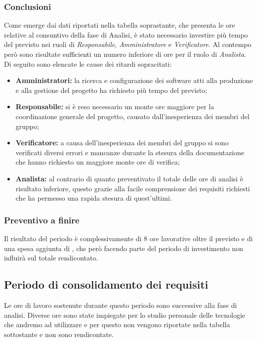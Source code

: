 \subsubsection{Conclusioni}
Come emerge dai dati riportati nella tabella soprastante, che presenta le ore relative al consuntivo della fase di Analisi, è stato necessario investire più tempo del previsto nei ruoli di \textit{Responsabile}, \textit{Amministratore} e \textit{Verificatore}.  Al contempo però sono risultate sufficienti
un numero inferiore di ore per il ruolo di \textit{Analista}. 
Di seguito sono elencate le cause dei ritardi sopracitati:
\begin{itemize}
	\item \textbf{Amministratori:} la ricerca e configurazione dei software atti alla produzione e alla gestione del progetto ha richiesto più tempo del previsto;
	\item \textbf{Responsabile:} si è reso necessario un monte ore maggiore per la coordinazione generale del progetto, causato dall'inesperienza dei membri del gruppo; 
	\item \textbf{Verificatore:} a causa dell'inesperienza dei membri del gruppo si sono verificati diversi errori e mancanze durante la stesura della documentazione che hanno richiesto un maggiore monte ore di verifica;
	\item \textbf{Analista:} al contrario di quanto preventivato il totale delle ore di analisi è risultato inferiore, questo grazie alla facile comprensione dei requisiti richiesti che ha permesso una rapida stesura di quest'ultimi.
\end{itemize}

\subsubsection{Preventivo a finire}
Il risultato del periodo è complessivamente di 8 ore lavorative oltre il previsto e di una
spesa aggiunta di , che però facendo parte del periodo di investimento
non influirà sul totale rendicontato.

\subsection{Periodo di consolidamento dei requisiti}
Le ore di lavoro sostenute durante questo periodo sono successive alla fase di analisi. Diverse ore sono state impiegate per lo studio personale delle tecnologie che andremo ad utilizzare e per questo non vengono riportate nella tabella sottostante e non sono rendicontate.


